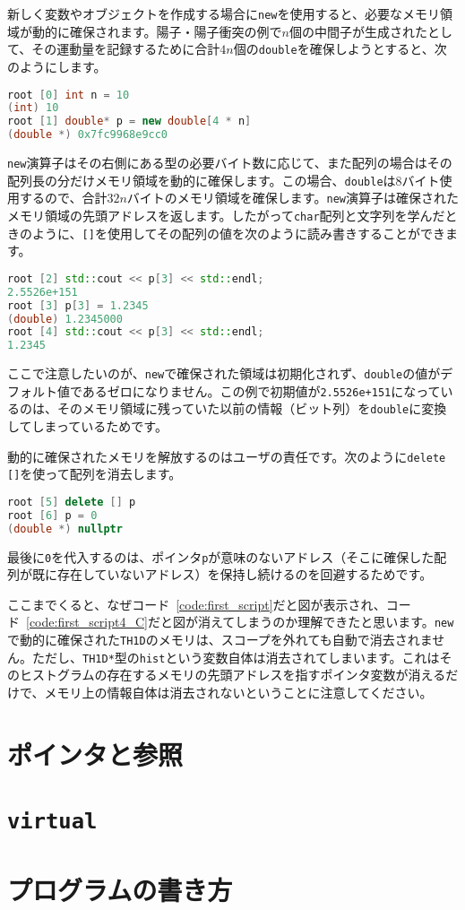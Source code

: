 新しく変数やオブジェクトを作成する場合に\texttt{new}を使用すると、必要なメモリ領域が動的に確保されます。陽子・陽子衝突の例で$n$個の中間子が生成されたとして、その運動量を記録するために合計$4n$個の\texttt{double}を確保しようとすると、次のようにします。
\begin{lstlisting}[language=c++]
root [0] int n = 10
(int) 10
root [1] double* p = new double[4 * n]
(double *) 0x7fc9968e9cc0
\end{lstlisting}
\texttt{new}演算子はその右側にある型の必要バイト数に応じて、また配列の場合はその配列長の分だけメモリ領域を動的に確保します。この場合、\texttt{double}は8バイト使用するので、合計$32n$バイトのメモリ領域を確保します。\texttt{new}演算子は確保されたメモリ領域の先頭アドレスを返します。したがって\texttt{char}配列と文字列を学んだときのように、\texttt{[]}を使用してその配列の値を次のように読み書きすることができます。
\begin{lstlisting}[language=c++]
root [2] std::cout << p[3] << std::endl;
2.5526e+151
root [3] p[3] = 1.2345
(double) 1.2345000
root [4] std::cout << p[3] << std::endl;
1.2345
\end{lstlisting}
ここで注意したいのが、\texttt{new}で確保された領域は初期化されず、\texttt{double}の値がデフォルト値であるゼロになりません。この例で初期値が\texttt{2.5526e+151}になっているのは、そのメモリ領域に残っていた以前の情報（ビット列）を\texttt{double}に変換してしまっているためです。

動的に確保されたメモリを解放するのはユーザの責任です。次のように\texttt{delete []}を使って配列を消去します。
\begin{lstlisting}[language=c++]
root [5] delete [] p
root [6] p = 0
(double *) nullptr
\end{lstlisting}
最後に\texttt{0}を代入するのは、ポインタ\texttt{p}が意味のないアドレス（そこに確保した配列が既に存在していないアドレス）を保持し続けるのを回避するためです。

ここまでくると、なぜコード~\ref{code:first_script}だと図が表示され、コード~\ref{code:first_script4_C}だと図が消えてしまうのか理解できたと思います。\texttt{new}で動的に確保された\texttt{TH1D}のメモリは、スコープを外れても自動で消去されません。ただし、\texttt{TH1D*}型の\texttt{hist}という変数自体は消去されてしまいます。これはそのヒストグラムの存在するメモリの先頭アドレスを指すポインタ変数が消えるだけで、メモリ上の情報自体は消去されないということに注意してください。

\section{ポインタと参照}
\label{sec:pointers}

\section{\texttt{virtual}}
\label{subsec:virtual}


\section{プログラムの書き方}
